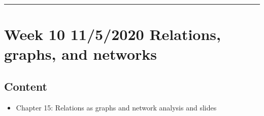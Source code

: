 \documentclass[letterpaper,10pt,english]{sphinxmanual}
\begin{document}
\bigskip\hrule\bigskip



\section{Week 10 \sphinxhyphen{} 11/5/2020 \sphinxhyphen{} Relations, graphs, and networks}
\label{\detokenize{course-schedule:week-10-11-5-2020-relations-graphs-and-networks}}

\subsection{Content}
\label{\detokenize{course-schedule:id17}}\begin{itemize}
\item {} 
Chapter 15: Relations as graphs and network analysis \sphinxhyphen{} {\hyperref[\detokenize{chapter-15-networks::doc}]{}} and slides

\end{itemize}
\end{document}
